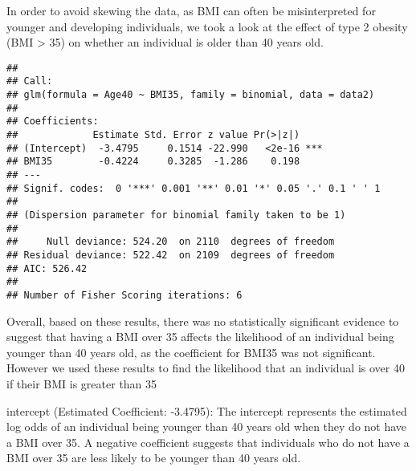 \documentclass[
]{article}
\newenvironment{Shaded}{\begin{snugshade}}{\end{snugshade}}
\newcommand{\AttributeTok}[1]{\textcolor[rgb]{0.13,0.29,0.53}{#1}}
\newcommand{\CommentTok}[1]{\textcolor[rgb]{0.56,0.35,0.01}{\textit{#1}}}
\newcommand{\DecValTok}[1]{\textcolor[rgb]{0.00,0.00,0.81}{#1}}
\newcommand{\FunctionTok}[1]{\textcolor[rgb]{0.13,0.29,0.53}{\textbf{#1}}}
\newcommand{\NormalTok}[1]{#1}
\newcommand{\OtherTok}[1]{\textcolor[rgb]{0.56,0.35,0.01}{#1}}
\newcommand{\SpecialCharTok}[1]{\textcolor[rgb]{0.81,0.36,0.00}{\textbf{#1}}}
\begin{document}
In order to avoid skewing the data, as BMI can often be misinterpreted
for younger and developing individuals, we took a look at the effect of
type 2 obesity (BMI \textgreater{} 35) on whether an individual is older
than 40 years old.

\begin{Shaded}
\end{Shaded}

\begin{verbatim}
## 
## Call:
## glm(formula = Age40 ~ BMI35, family = binomial, data = data2)
## 
## Coefficients:
##             Estimate Std. Error z value Pr(>|z|)    
## (Intercept)  -3.4795     0.1514 -22.990   <2e-16 ***
## BMI35        -0.4224     0.3285  -1.286    0.198    
## ---
## Signif. codes:  0 '***' 0.001 '**' 0.01 '*' 0.05 '.' 0.1 ' ' 1
## 
## (Dispersion parameter for binomial family taken to be 1)
## 
##     Null deviance: 524.20  on 2110  degrees of freedom
## Residual deviance: 522.42  on 2109  degrees of freedom
## AIC: 526.42
## 
## Number of Fisher Scoring iterations: 6
\end{verbatim}

Overall, based on these results, there was no statistically significant
evidence to suggest that having a BMI over 35 affects the likelihood of
an individual being younger than 40 years old, as the coefficient for
BMI35 was not significant. However we used these results to find the
likelihood that an individual is over 40 if their BMI is greater than 35

intercept (Estimated Coefficient: -3.4795): The intercept represents the
estimated log odds of an individual being younger than 40 years old when
they do not have a BMI over 35. A negative coefficient suggests that
individuals who do not have a BMI over 35 are less likely to be younger
than 40 years old.
\end{document}
